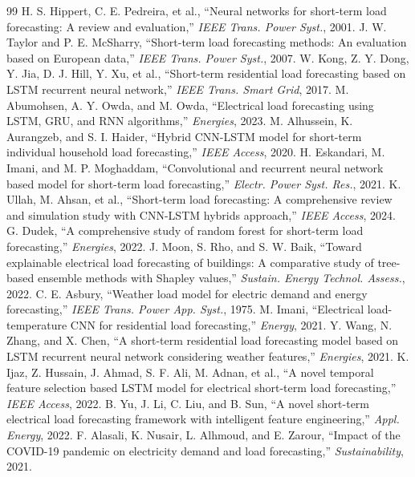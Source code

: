 \documentclass[10pt,letterpaper,twocolumn]{article}
\begin{document}
\begin{thebibliography}{99}\footnotesize
\setlength{\itemsep}{1pt}
 H. S. Hippert, C. E. Pedreira, et al., ``Neural networks for short-term load forecasting: A review and evaluation,'' \textit{IEEE Trans. Power Syst.}, 2001.
 J. W. Taylor and P. E. McSharry, ``Short-term load forecasting methods: An evaluation based on European data,'' \textit{IEEE Trans. Power Syst.}, 2007.
 W. Kong, Z. Y. Dong, Y. Jia, D. J. Hill, Y. Xu, et al., ``Short-term residential load forecasting based on LSTM recurrent neural network,'' \textit{IEEE Trans. Smart Grid}, 2017.
 M. Abumohsen, A. Y. Owda, and M. Owda, ``Electrical load forecasting using LSTM, GRU, and RNN algorithms,'' \textit{Energies}, 2023.
 M. Alhussein, K. Aurangzeb, and S. I. Haider, ``Hybrid CNN-LSTM model for short-term individual household load forecasting,'' \textit{IEEE Access}, 2020.
 H. Eskandari, M. Imani, and M. P. Moghaddam, ``Convolutional and recurrent neural network based model for short-term load forecasting,'' \textit{Electr. Power Syst. Res.}, 2021.
 K. Ullah, M. Ahsan, et al., ``Short-term load forecasting: A comprehensive review and simulation study with CNN-LSTM hybrids approach,'' \textit{IEEE Access}, 2024.
 G. Dudek, ``A comprehensive study of random forest for short-term load forecasting,'' \textit{Energies}, 2022.
 J. Moon, S. Rho, and S. W. Baik, ``Toward explainable electrical load forecasting of buildings: A comparative study of tree-based ensemble methods with Shapley values,'' \textit{Sustain. Energy Technol. Assess.}, 2022.
 C. E. Asbury, ``Weather load model for electric demand and energy forecasting,'' \textit{IEEE Trans. Power App. Syst.}, 1975.
 M. Imani, ``Electrical load-temperature CNN for residential load forecasting,'' \textit{Energy}, 2021.
 Y. Wang, N. Zhang, and X. Chen, ``A short-term residential load forecasting model based on LSTM recurrent neural network considering weather features,'' \textit{Energies}, 2021.
 K. Ijaz, Z. Hussain, J. Ahmad, S. F. Ali, M. Adnan, et al., ``A novel temporal feature selection based LSTM model for electrical short-term load forecasting,'' \textit{IEEE Access}, 2022.
 B. Yu, J. Li, C. Liu, and B. Sun, ``A novel short-term electrical load forecasting framework with intelligent feature engineering,'' \textit{Appl. Energy}, 2022.
 F. Alasali, K. Nusair, L. Alhmoud, and E. Zarour, ``Impact of the COVID-19 pandemic on electricity demand and load forecasting,'' \textit{Sustainability}, 2021.

\end{thebibliography}
\end{document}
